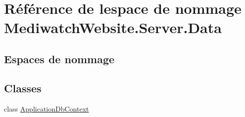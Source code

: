 \hypertarget{namespace_mediwatch_website_1_1_server_1_1_data}{}\section{Référence de l\textquotesingle{}espace de nommage Mediwatch\+Website.\+Server.\+Data}
\label{namespace_mediwatch_website_1_1_server_1_1_data}
\subsection*{Espaces de nommage}
\begin{DoxyCompactItemize}
\end{DoxyCompactItemize}
\subsection*{Classes}
\begin{DoxyCompactItemize}
\item 
class \hyperlink{class_mediwatch_website_1_1_server_1_1_data_1_1_application_db_context}{Application\+Db\+Context}
\end{DoxyCompactItemize}
